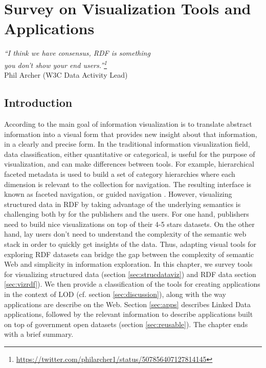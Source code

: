 \chapter{Survey on Visualization Tools and Applications}
\label{ch:ch4}

\begin{flushright}
\textit{``I think we have consensus, RDF is something \\
you don't show your end users.''\footnote{\url{https://twitter.com/philarcher1/status/507856407127814145}}}  \\
Phil Archer (W3C Data Activity Lead)
\end{flushright}


\section{Introduction}
\label{sec:intro-ch4}

According to \cite{marti2009} the main goal of information visualization is to translate abstract information into a visual form that provides new insight about that information, in a clearly and precise form. In the traditional information visualization field, data classification, either quantitative or categorical, is useful for the purpose of visualization, and can make differences between tools. For example, hierarchical faceted metadata is used to build a set of category hierarchies where each dimension is relevant to the collection for navigation. The resulting interface is known as faceted navigation, or guided navigation \cite{hearst02}. However, visualizing structured data in RDF by taking advantage of the underlying semantics is challenging both by for the publishers and the users. For one hand, publishers need to build nice visualizations on top of their 4-5 stars datasets. On the other hand, lay users don't need to understand the complexity of the semantic web stack in order to quickly get insights of the data. Thus, adapting visual tools for exploring RDF datasets can bridge the gap between the complexity of semantic Web and simplicity in information exploration. In this chapter, we survey tools for visualizing structured data (section \ref{sec:strucdataviz}) and RDF data section \ref{sec:vizrdf}). We then provide a classification of the tools for creating applications in the context of LOD (cf. section \ref{sec:discussion}), along with the way applications are describe on the Web. Section \ref{sec:apps} describes Linked Data applications, followed by the relevant information to describe applications built on top of government open datasets (section \ref{sec:reusable}). The chapter ends with a brief summary. 

